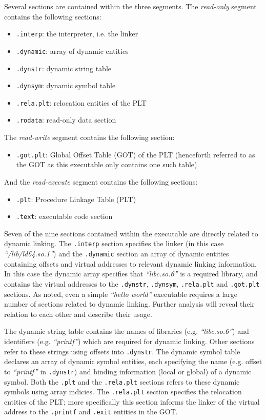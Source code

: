 Several sections are contained within the three segments. The \textit{read-only} segment contains the following sections:

\begin{itemize}
	\item \texttt{.interp}: the interpreter, i.e. the linker
	\item \texttt{.dynamic}: array of dynamic entities
	\item \texttt{.dynstr}: dynamic string table
	\item \texttt{.dynsym}: dynamic symbol table
	\item \texttt{.rela.plt}: relocation entities of the PLT
	\item \texttt{.rodata}: read-only data section
\end{itemize}

The \textit{read-write} segment contains the following section:

\begin{itemize}
	\item \texttt{.got.plt}: Global Offset Table (GOT) of the PLT (henceforth referred to as the GOT as this executable only contains one such table)
\end{itemize}

And the \textit{read-execute} segment contains the following sections:

\begin{itemize}
	\item \texttt{.plt}: Procedure Linkage Table (PLT)
	\item \texttt{.text}: executable code section
\end{itemize}

Seven of the nine sections contained within the executable are directly related to dynamic linking. The \texttt{.interp} section specifies the linker (in this case \textit{``/lib/ld64.so.1''}) and the \texttt{.dynamic} section an array of dynamic entities containing offsets and virtual addresses to relevant dynamic linking information. In this case the dynamic array specifies that \textit{``libc.so.6''} is a required library, and contains the virtual addresses to the \texttt{.dynstr}, \texttt{.dynsym}, \texttt{.rela.plt} and \texttt{.got.plt} sections. As noted, even a simple \textit{``hello world''} executable requires a large number of sections related to dynamic linking. Further analysis will reveal their relation to each other and describe their usage.

The dynamic string table contains the names of libraries (e.g. \textit{``libc.so.6''}) and identifiers (e.g. \textit{``printf''}) which are required for dynamic linking. Other sections refer to these strings using offsets into \texttt{.dynstr}. The dynamic symbol table declares an array of dynamic symbol entities, each specifying the name (e.g. offset to \textit{``printf''} in \texttt{.dynstr}) and binding information (local or global) of a dynamic symbol. Both the \texttt{.plt} and the \texttt{.rela.plt} sections refers to these dynamic symbols using array indicies. The \texttt{.rela.plt} section specifies the relocation entities of the PLT; more specifically this section informs the linker of the virtual address to the \texttt{.printf} and \texttt{.exit} entities in the GOT.


